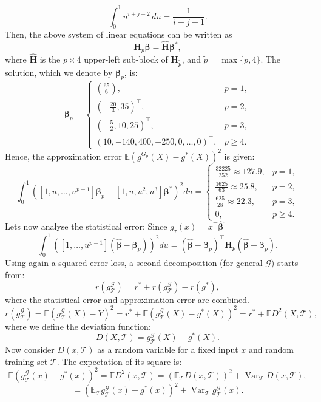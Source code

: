 \documentclass[12pt]{article}
\begin{document}
\[
\int_0^1 u^{i + j - 2} \, du = \frac{1}{i + j - 1}.
\]
Then, the above system of linear equations can be written as
\[
\mathbf{H}_p \bm{\beta} = \widehat{\mathbf{H}} \bm{\beta}^*,
\]
where \( \widehat{\mathbf{H}} \) is the \( p \times 4 \) upper-left sub-block of \( \mathbf{H}_{\widetilde{p}} \), and \( \widetilde{p} = \max\{p, 4\} \).
The solution, which we denote by \( \bm{\beta}_p \), is:
\[
\bm{\beta}_p =
\begin{cases}
\left( \frac{65}{6} \right), & p = 1, \\
\left( -\frac{20}{3}, 35 \right)^\top, & p = 2, \\
\left( -\frac{5}{2}, 10, 25 \right)^\top, & p = 3, \\
\left( 10, -140, 400, -250, 0, \dots, 0 \right)^\top, & p \geq 4.
\end{cases}
\]
Hence, the approximation error $\mathbb{E}(g^{G_p}(X)-g^*(X))^2$ is given:
\[
\int_0^1 \left( [1, u, \dots, u^{p-1}] \bm{\beta}_p - [1, u, u^2, u^3] \bm{\beta}^* \right)^2 du =
\begin{cases}
\frac{32225}{252} \approx 127.9, & p = 1, \\
\frac{1625}{63} \approx 25.8, & p = 2, \\
\frac{625}{28} \approx 22.3, & p = 3, \\
0, & p \geq 4.
\end{cases}
\]
Lets now analyse the statistical error: Since $g_\tau (x) = x^\top \hat{\boldsymbol{\beta}}$
\[
\int_0^1 \left( [1, \dots, u^{p-1}] (\widehat{\bm{\beta}} - \bm{\beta}_p) \right)^2 du 
= (\widehat{\bm{\beta}} - \bm{\beta}_p)^\top \mathbf{H}_p (\widehat{\bm{\beta}} - \bm{\beta}_p).
\]
Using again a squared-error loss, a second decomposition (for general \( \mathcal{G} \)) starts from:
\[
r(g^{\mathcal{G}}_{\mathcal{T}}) = r^* + r(g^{\mathcal{G}}_{\mathcal{T}}) - r(g^*),
\]
where the statistical error and approximation error are combined.
\[
r(g^{\mathcal{G}}_{\mathcal{T}}) = \mathbb{E}(g^{\mathcal{G}}_{\mathcal{T}}(X) - Y)^2 
= r^* + \mathbb{E}\left(g^{\mathcal{G}}_{\mathcal{T}}(X) - g^*(X)\right)^2 
= r^* + \mathbb{E}D^2(X, \mathcal{T}),
\]
where we define the deviation function:
\[
D(X, \mathcal{T}) = g^{\mathcal{G}}_{\mathcal{T}}(X) - g^*(X).
\]
Now consider \( D(x, \mathcal{T}) \) as a random variable for a fixed input \( x \) and random training set \( \mathcal{T} \). The expectation of its square is:
\[
\mathbb{E}\left( g^{\mathcal{G}}_{\mathcal{T}}(x) - g^*(x) \right)^2 
= \mathbb{E} D^2(x, \mathcal{T}) 
= \left( \mathbb{E}_{\mathcal{T}} D(x, \mathcal{T}) \right)^2 + \operatorname{Var}_{\mathcal{T}} D(x, \mathcal{T}),
\]
\[
= \left( \mathbb{E}_{\mathcal{T}} g^{\mathcal{G}}_{\mathcal{T}}(x) - g^*(x) \right)^2 + \operatorname{Var}_{\mathcal{T}} g^{\mathcal{G}}_{\mathcal{T}}(x).
\]
\end{document}
